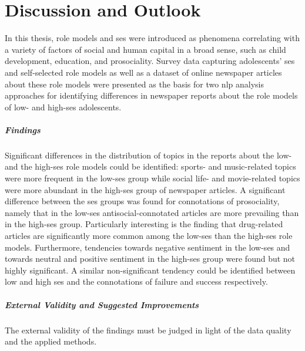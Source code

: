 \renewcommand{\imagepath}{../80-outro/img}

\chapter{Discussion and Outlook}
In this thesis, role models and \gls{ses} were introduced as phenomena correlating with a variety of factors of social and human capital in a broad sense, such as child development, education, and prosociality. Survey data capturing adolescents' \gls{ses} and self-selected role models as well as a dataset of online newspaper articles about these role models were presented as the basis for two \gls{nlp} analysis approaches for identifying differences in newspaper reports about the role models of low- and high-\gls{ses} adolescents.

\paragraph{Findings}
Significant differences in the distribution of topics in the reports about the low- and the high-\gls{ses} role models could be identified: sports- and music-related topics were more frequent in the low-\gls{ses} group while social life- and movie-related topics were more abundant in the high-\gls{ses} group of newspaper articles. A significant difference between the \gls{ses} groups was found for connotations of prosociality, namely that in the low-\gls{ses} antisocial-connotated articles are more prevailing than in the high-\gls{ses} group. Particularly interesting is the finding that drug-related articles are significantly more common among the low-\gls{ses} than the high-\gls{ses} role models. Furthermore, tendencies towards negative sentiment in the low-\gls{ses} and towards neutral and positive sentiment in the high-\gls{ses} group were found but not highly significant. A similar non-significant tendency could be identified between low and high \gls{ses} and the connotations of failure and success respectively.

\paragraph{External Validity and Suggested Improvements}
The external validity of the findings must be judged in light of the data quality and the applied methods.

